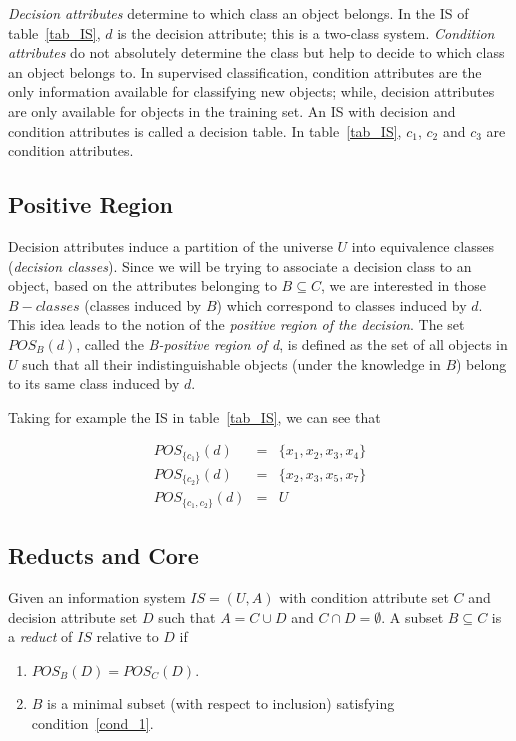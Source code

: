 \documentclass[authoryear,11pt]{elsarticle}
\begin{document}
   
  \textit{Decision attributes} determine to which class an object belongs. In the IS of
  table~\ref{tab_IS}, $d$ is the decision attribute; this is a two-class system. \textit{Condition attributes} 
  do not absolutely determine the class but help to decide to which class an object belongs to. In supervised 
  classification, condition attributes are the only information available for classifying new objects; while, 
  decision attributes are only available for objects in the training set. An IS with decision and 
  condition attributes is called a decision table. In table~\ref{tab_IS}, $c_1$, $c_2$ and $c_3$ are condition 
  attributes.
  
\subsection{Positive Region}\label{subsect_Pos}
  Decision attributes induce a partition of the universe $U$ into equivalence classes 
  (\textit{decision classes}). Since we will be trying to associate a decision class to an object, 
  based on the attributes belonging to $B \subseteq C$, we are interested in those 
  $B-classes$ (classes induced by $B$) which correspond to classes induced by $d$. 
  This idea leads to the notion of the  \textit{positive region of the decision}. The set $POS_B(d)$, 
  called the \textit{B-positive region of d}, is defined as the set of all objects in $U$ such 
  that all their indistinguishable objects (under the knowledge in $B$) belong to its same class induced 
  by $d$.
  
  Taking for example the IS in table~\ref{tab_IS}, we can see that
  
  $$\begin{array}{lcc}
  POS_{\lbrace c_1 \rbrace}(d)     &=& \lbrace x_1,x_2,x_3,x_4 \rbrace\\
  POS_{\lbrace c_2 \rbrace}(d)     &=& \lbrace x_2,x_3,x_5,x_7 \rbrace\\
  POS_{\lbrace c_1, c_2 \rbrace}(d)&=& U
  \end{array}$$
 
\subsection{Reducts and Core}\label{def_reduct}
  Given an information system $IS=(U,A)$ with condition attribute set $C$ and decision attribute set
  $D$ such that $A=C \cup D$ and $C \cap D =\emptyset$. A subset $B \subseteq C$ is a \textit{reduct} 
  of $IS$ relative to $D$ if
  \begin{enumerate}
  	\item $POS_B(D)=POS_C(D)$. \label{cond_1}
  	\item $B$ is a minimal subset (with respect to inclusion) satisfying condition~\ref{cond_1}.\label{cond_2}
  \end{enumerate}
\end{document}
